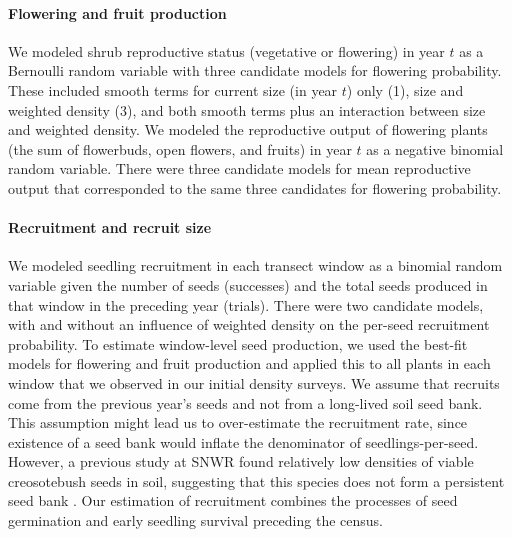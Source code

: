 \documentclass[11pt]{article}\usepackage[]{graphicx}\usepackage[usenames,dvipsnames]{xcolor}
\begin{document}

\paragraph{Flowering and fruit production}
We modeled shrub reproductive status (vegetative or flowering) in year $t$ as a Bernoulli random variable with three candidate models for flowering probability.
These included smooth terms for current size (in year $t$) only (1), size and weighted density (3), and both smooth terms plus an interaction between size and weighted density. 
We modeled the reproductive output of flowering plants (the sum of flowerbuds, open flowers, and fruits) in year $t$ as a negative binomial random variable. 
There were three candidate models for mean reproductive output that corresponded to the same three candidates for flowering probability. 

\paragraph{Recruitment and recruit size}
We modeled seedling recruitment in each transect window as a binomial random variable given the number of seeds (successes) and the total seeds produced in that window in the preceding year (trials). 
There were two candidate models, with and without an influence of weighted density on the per-seed recruitment probability. 
To estimate window-level seed production, we used the best-fit models for flowering and fruit production and applied this to all plants in each window that we observed in our initial density surveys. 
We assume that recruits come from the previous year's seeds and not from a long-lived soil seed bank. 
This assumption might lead us to over-estimate the recruitment rate, since existence of a seed bank would inflate the denominator of seedlings-per-seed.
However, a previous study at SNWR found relatively low densities of viable creosotebush seeds in soil, suggesting that this species does not form a persistent seed bank \citep{moreno2016seed}. 
Our estimation of recruitment combines the processes of seed germination and early seedling survival preceding the census.
\end{document}
